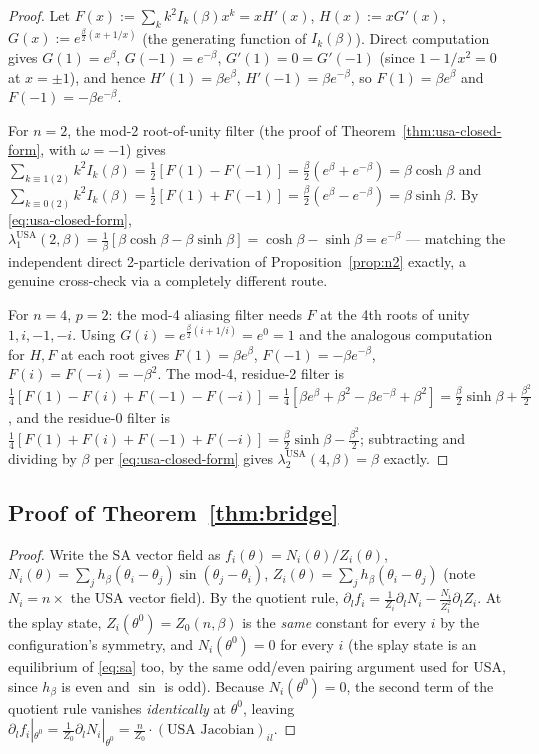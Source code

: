 \documentclass[11pt]{article}
\begin{document}
\begin{proof}
Let $F(x):=\sum_k k^2I_k(\beta)x^k = xH'(x)$, $H(x):=xG'(x)$, $G(x):=e^{\frac\beta2(x+1/x)}$ (the generating function of $I_k(\beta)$). Direct computation gives $G(1)=e^\beta$, $G(-1)=e^{-\beta}$, $G'(1)=0=G'(-1)$ (since $1-1/x^2=0$ at $x=\pm1$), and hence $H'(1)=\beta e^\beta$, $H'(-1)=\beta e^{-\beta}$, so $F(1)=\beta e^\beta$ and $F(-1)=-\beta e^{-\beta}$.

\begin{sloppypar}
For $n=2$, the mod-2 root-of-unity filter (the proof of Theorem~\ref{thm:usa-closed-form}, with $\omega=-1$) gives $\sum_{k\equiv1(2)}k^2I_k(\beta) = \frac12[F(1)-F(-1)] = \frac\beta2(e^\beta+e^{-\beta}) = \beta\cosh\beta$ and $\sum_{k\equiv0(2)}k^2I_k(\beta) = \frac12[F(1)+F(-1)] = \frac\beta2(e^\beta-e^{-\beta}) = \beta\sinh\beta$. By \eqref{eq:usa-closed-form}, $\lambda_1^{\mathrm{USA}}(2,\beta) = \frac1\beta[\beta\cosh\beta - \beta\sinh\beta] = \cosh\beta-\sinh\beta = e^{-\beta}$ --- matching the independent direct 2-particle derivation of Proposition~\ref{prop:n2} exactly, a genuine cross-check via a completely different route.
\end{sloppypar}

For $n=4$, $p=2$: the mod-4 aliasing filter needs $F$ at the 4th roots of unity $1,i,-1,-i$. Using $G(i)=e^{\frac\beta2(i+1/i)}=e^0=1$ and the analogous computation for $H,F$ at each root gives $F(1)=\beta e^\beta$, $F(-1)=-\beta e^{-\beta}$, $F(i)=F(-i)=-\beta^2$. The mod-4, residue-2 filter is $\frac14[F(1)-F(i)+F(-1)-F(-i)] = \frac14[\beta e^\beta+\beta^2-\beta e^{-\beta}+\beta^2] = \frac\beta2\sinh\beta+\frac{\beta^2}{2}$, and the residue-0 filter is $\frac14[F(1)+F(i)+F(-1)+F(-i)]=\frac\beta2\sinh\beta-\frac{\beta^2}{2}$; subtracting and dividing by $\beta$ per \eqref{eq:usa-closed-form} gives $\lambda_2^{\mathrm{USA}}(4,\beta)=\beta$ exactly.
\end{proof}

\subsection{Proof of Theorem~\ref{thm:bridge}}
\label{app:bridge}

\begin{proof}
Write the SA vector field as $f_i(\theta)=N_i(\theta)/Z_i(\theta)$, $N_i(\theta)=\sum_j h_\beta(\theta_i-\theta_j)\sin(\theta_j-\theta_i)$, $Z_i(\theta)=\sum_j h_\beta(\theta_i-\theta_j)$ (note $N_i = n\times$ the USA vector field). By the quotient rule, $\partial_l f_i = \frac{1}{Z_i}\partial_l N_i - \frac{N_i}{Z_i^2}\partial_l Z_i$. At the splay state, $Z_i(\theta^0)=Z_0(n,\beta)$ is the \emph{same} constant for every $i$ by the configuration's symmetry, and $N_i(\theta^0)=0$ for every $i$ (the splay state is an equilibrium of \eqref{eq:sa} too, by the same odd/even pairing argument used for USA, since $h_\beta$ is even and $\sin$ is odd). Because $N_i(\theta^0)=0$, the second term of the quotient rule vanishes \emph{identically} at $\theta^0$, leaving $\partial_l f_i|_{\theta^0} = \frac{1}{Z_0}\partial_l N_i|_{\theta^0} = \frac{n}{Z_0}\cdot(\text{USA Jacobian})_{il}$.
\end{proof}
\end{document}

